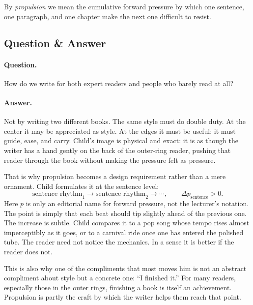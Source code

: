 \begin{definition}
By \textit{propulsion} we mean the cumulative forward pressure by which one sentence, one paragraph, and one chapter make the next one difficult to resist.
\end{definition}

\subsection{Question \& Answer}

\paragraph{Question.} How do we write for both expert readers and people who barely read at all?

\paragraph{Answer.} Not by writing two different books. The same style must do double duty. At the center it may be appreciated as style. At the edges it must be useful; it must guide, ease, and carry. Child's image is physical and exact: it is as though the writer has a hand gently on the back of the outer-ring reader, pushing that reader through the book without making the pressure felt as pressure.

That is why propulsion becomes a design requirement rather than a mere ornament. Child formulates it at the sentence level:
\begin{equation}
\text{sentence rhythm}_1 \to \text{sentence rhythm}_2 \to \cdots,
\qquad
\Delta p_{\text{sentence}} > 0.
\end{equation}
Here \(p\) is only an editorial name for forward pressure, not the lecturer's notation. The point is simply that each beat should tip slightly ahead of the previous one. The increase is subtle. Child compares it to a pop song whose tempo rises almost imperceptibly as it goes, or to a carnival ride once one has entered the polished tube. The reader need not notice the mechanics. In a sense it is better if the reader does not.

This is also why one of the compliments that most moves him is not an abstract compliment about style but a concrete one: ``I finished it.'' For many readers, especially those in the outer rings, finishing a book is itself an achievement. Propulsion is partly the craft by which the writer helps them reach that point.

